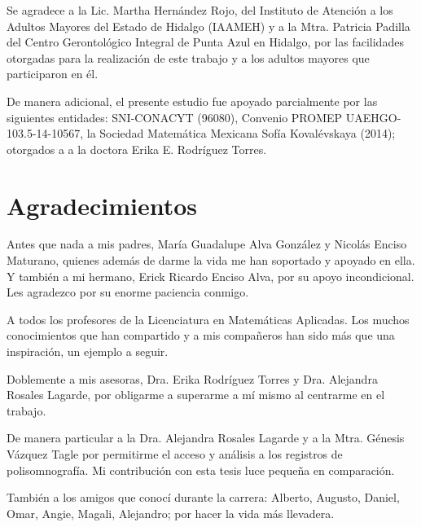 \documentclass[12pt,letterpaper]{book}
\begin{document}
Se agradece a la Lic. Martha Hernández Rojo, del Instituto de Atención a los Adultos Mayores del Estado de Hidalgo (IAAMEH) y a la Mtra. Patricia Padilla del Centro Gerontológico Integral de Punta Azul en Hidalgo, por las facilidades otorgadas para la realización de este trabajo y a los adultos mayores que participaron en él.%

De manera adicional, el presente estudio fue apoyado parcialmente por las siguientes entidades: 
SNI-CONACYT (96080), Convenio PROMEP UAEHGO-103.5-14-10567, la Sociedad Matemática Mexicana Sofía 
Kovalévskaya (2014); otorgados a a la doctora Erika E. Rodríguez Torres.

\newpage


\chapter*{Agradecimientos}

Antes que nada a mis padres, María Guadalupe Alva González y Nicolás Enciso Maturano, quienes 
además de darme la vida me han soportado y apoyado en ella. Y también a mi hermano, Erick Ricardo 
Enciso Alva, por su apoyo incondicional.
%
Les agradezco por su enorme paciencia conmigo.

A todos los profesores de la Licenciatura en Matemáticas Aplicadas. Los muchos conocimientos que 
han compartido y a mis compañeros han sido más que una inspiración, un ejemplo a seguir.
%

Doblemente a mis asesoras, Dra. Erika Rodríguez Torres y Dra. Alejandra Rosales Lagarde, por 
obligarme a superarme a mí mismo al centrarme en el trabajo.

De manera particular a la Dra. Alejandra Rosales Lagarde y a la Mtra. Génesis Vázquez Tagle por 
permitirme el acceso y análisis a los registros de polisomnografía. Mi contribución con esta 
tesis luce pequeña en comparación.

También a los amigos que conocí durante la carrera: Alberto, Augusto, Daniel, Omar, Angie, Magali, 
Alejandro; por hacer la vida más llevadera.

\end{document}
